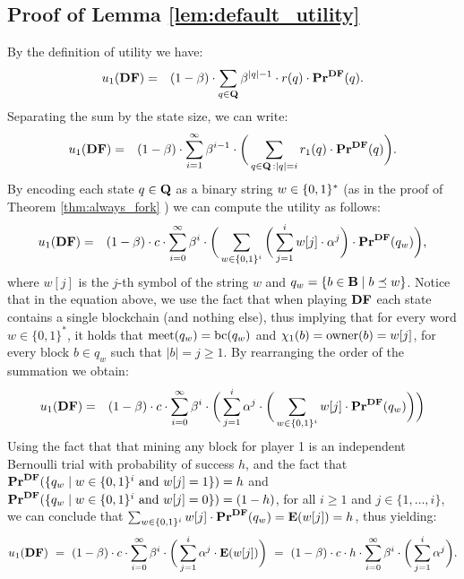 \subsection*{Proof of Lemma \ref{lem:default_utility}}
By the definition of utility we have:
\begin{eqnarray*}
u_1(\text{\rm {\bf DF}}) & = & (1-\beta) \cdot \sum_{q\in \mathbf{Q}}\beta^{|q|-1}\cdot r(q)\cdot \mathbf{Pr}^{\text{\rm {\bf DF}}}(q).
\end{eqnarray*}
Separating the sum by the state size, we can write:
\begin{eqnarray*}
u_1(\text{\rm {\bf DF}}) & = & (1-\beta) \cdot \sum_{i=1}^{\infty}\beta^{i-1} \cdot  \bigg(\sum_{\substack{q \in \mathbf{Q} \,: |q| = i}} r_1(q) \cdot 
\mathbf{Pr}^{\text{\rm {\bf DF}}}(q)\bigg).
\end{eqnarray*}
By encoding each state $q\in\mathbf{Q}$ as a binary string $w\in \{0,1\}^\ast$ (as in the proof of Theorem \ref{thm:always_fork} ) we can compute the utility as follows:
\begin{eqnarray*}
u_1(\text{\rm {\bf DF}})& = & (1-\beta) \cdot c\cdot \sum_{i=0}^{\infty}\beta^{i} \cdot\bigg(\sum_{w\in\{0,1\}^i}  \bigg( \sum_{j=1}^{i}w[j] \cdot \alpha^j \bigg)\cdot 
\mathbf{Pr}^{\text{\rm {\bf DF}}}(q_w)\bigg),
\end{eqnarray*}
where $w[j]$ is the $j$-th symbol of the string $w$ and $q_w = \{ b \in \mathbf{B} \mid b \preceq w\}$. 
Notice that in the equation above, we use the fact that when playing $\text{\rm {\bf DF}}$ each state contains a single blockchain (and nothing else), thus implying that for every word $w\in \{0,1\}^*$, it holds that $\text{\rm meet}(q_w) = \text{bc}(q_w)$ and $\chi_1(b) = \text{\rm owner}(b) = w[j]$, for every block $b \in q_w$ such that $|b| = j \geq 1$. By rearranging the order of the summation we obtain:
\begin{eqnarray*}
u_1(\text{\rm {\bf DF}} )& = &(1-\beta) \cdot c\cdot \sum_{i=0}^{\infty}\beta^{i} \cdot \bigg(\sum_{j=1}^{i} \alpha^j \cdot\bigg(\sum_{w\in\{0,1\}^i}   w[j]\cdot 
\mathbf{Pr}^{\text{\rm {\bf DF}}}(q_w)\bigg)\bigg)
\end{eqnarray*}
Using the fact that that mining any block for player 1 is an independent Bernoulli trial with probability of success $h$, and the fact that $\mathbf{Pr}^{\text{\rm {\bf DF}}}(\{q_w \mid w\in \{0,1\}^i \text{ and } w[j]=1\})=h$ and $\mathbf{Pr}^{\text{\rm {\bf DF}}}(\{q_w \mid w\in \{0,1\}^i \text{ and } w[j]=0\})=(1-h)$, for all $i \geq 1$ and $j \in \{1, \ldots, i\}$, we can conclude that $\sum_{w\in\{0,1\}^i}   w[j] \cdot \mathbf{Pr}^{\text{\rm {\bf DF}}}(q_w) = \mathbf{E}(w[j]) = h$, thus yielding:
\begin{eqnarray*}	
u_1(\cdf) \ = \ (1-\beta) \cdot c\cdot \sum_{i=0}^{\infty}\beta^{i} \cdot \bigg(\sum_{j=1}^{i} \alpha^j \cdot \expected(w[j])\bigg) \ = \ (1-\beta) \cdot c \cdot h \cdot \sum_{i=0}^{\infty}\beta^{i} \cdot \bigg(\sum_{j=1}^{i} \alpha^j\bigg) .
\end{eqnarray*}
